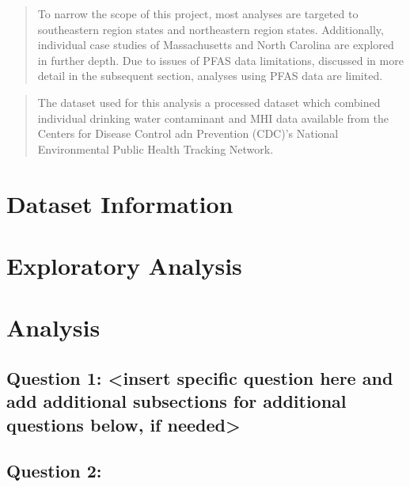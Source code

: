\documentclass[12pt,]{article}
\begin{document}
\begin{quote}
To narrow the scope of this project, most analyses are targeted to
southeastern region states and northeastern region states. Additionally,
individual case studies of Massachusetts and North Carolina are explored
in further depth. Due to issues of PFAS data limitations, discussed in
more detail in the subsequent section, analyses using PFAS data are
limited.
\end{quote}

\begin{quote}
The dataset used for this analysis a processed dataset which combined
individual drinking water contaminant and MHI data available from the
Centers for Disease Control adn Prevention (CDC)'s National
Environmental Public Health Tracking Network.
\end{quote}

\newpage

\hypertarget{dataset-information}{%
\section{Dataset Information}\label{dataset-information}}

\newpage

\hypertarget{exploratory-analysis}{%
\section{Exploratory Analysis}\label{exploratory-analysis}}

\newpage

\hypertarget{analysis}{%
\section{Analysis}\label{analysis}}

\hypertarget{question-1-insert-specific-question-here-and-add-additional-subsections-for-additional-questions-below-if-needed}{%
\subsection{Question 1: \textless{}insert specific question here and add
additional subsections for additional questions below, if
needed\textgreater{}}\label{question-1-insert-specific-question-here-and-add-additional-subsections-for-additional-questions-below-if-needed}}

\hypertarget{question-2}{%
\subsection{Question 2:}\label{question-2}}
\end{document}

